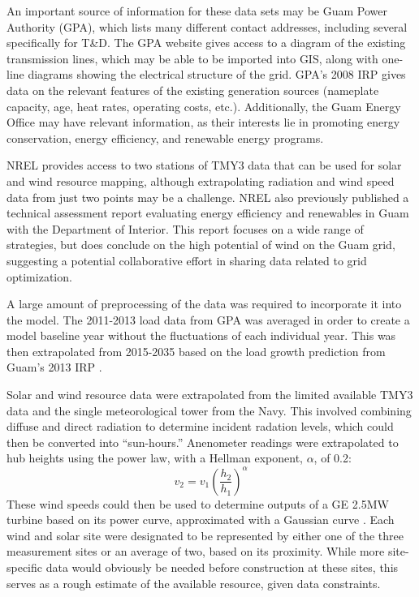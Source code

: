 \documentclass[12pt,letterpaper,fleqn]{report}
\begin{document}
An important source of information for these data sets may be Guam
Power Authority (GPA), which lists many different contact addresses,
including several specifically for T\&D. The GPA website gives access
to a diagram of the existing transmission lines, which may be able to
be imported into GIS, along with one-line diagrams showing the
electrical structure of the grid. GPA’s 2008 IRP gives data on the
relevant features of the existing generation sources (nameplate
capacity, age, heat rates, operating costs, etc.). Additionally, the
Guam Energy Office may have relevant information, as their interests
lie in promoting energy conservation, energy efficiency, and renewable
energy programs.

NREL provides access to two stations of TMY3 data that can be used for
solar and wind resource mapping, although extrapolating radiation and
wind speed data from just two points may be a challenge. NREL also
previously published a technical assessment report evaluating energy
efficiency and renewables in Guam with the Department of
Interior. This report focuses on a wide range of strategies, but does
conclude on the high potential of wind on the Guam grid, suggesting a
potential collaborative effort in sharing data related to grid
optimization.

A large amount of preprocessing of the data was required to
incorporate it into the model. The 2011-2013 load data from GPA was
averaged in order to create a model baseline year without the
fluctuations of each individual year. This was then extrapolated from
2015-2035 based on the load growth prediction from Guam's 2013 IRP
\cite{gpa13a}. 

Solar and wind resource data were extrapolated from the limited
available TMY3 data and the single meteorological tower from the
Navy. This involved combining diffuse and direct radiation to
determine incident radation levels, which could then be converted into
``sun-hours.'' Anenometer readings were extrapolated to hub heights
using the power law, with a Hellman exponent, $\alpha$, of 0.2:
\[v_2 = v_1\left(\frac{h_2}{h_1}\right)^\alpha\] 
These wind speeds could then be used to determine outputs of a GE
2.5MW turbine based on its power curve, approximated with a Gaussian
curve \cite{ge}. Each wind and solar site were designated to be
represented by either one of the three measurement sites or an average
of two, based on its proximity. While more site-specific data would
obviously be needed before construction at these sites, this serves as
a rough estimate of the available resource, given data constraints.
\end{document}
